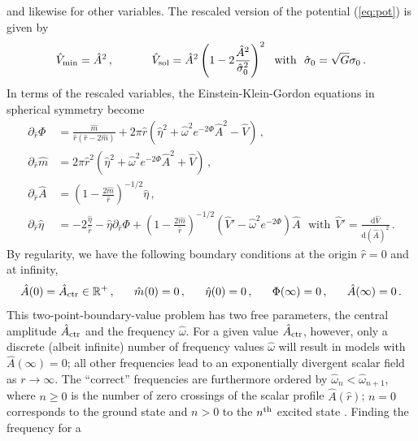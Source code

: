 \documentclass[]{iopart}
\newcommand{\du}{\mathrm{d}}
\begin{document}
%
and likewise for other variables. The rescaled version
of the potential (\ref{eq:pot}) is given by
%
\begin{equation}
  \hat{V}_{\rm min} = \hat{A}^2\,,~~~~~~~~~~
  \hat{V}_{\rm sol} =
  \hat{A}^2
  \left(
  1-2\frac{\hat{A}^2}{\hat{\sigma}_0^2}
  \right)^2~~\text{with}~~\hat{\sigma}_0=\sqrt{G}\sigma_0\,.
  \label{eq:potentials}
\end{equation}
%
In terms of the rescaled variables, the Einstein-Klein-Gordon
equations in spherical symmetry become
%
\begin{align}
  \partial_{\hat{r}}\Phi &=
  \frac{\hat{m}}{\hat{r}(\hat{r}-2\hat{m})}
  +
  2\pi \hat{r}
  \left(
  \hat{\eta}^2
  +\hat{\omega}^2e^{-2\Phi}\hat{A}^2
  -\hat{V}
  \right)\,, \label{eq:Phir} \\
  \partial_{\hat{r}}\hat{m} &=
  2\pi \hat{r}^2
  \left(
  \hat{\eta}^2
  +\hat{\omega}^2e^{-2\Phi}\hat{A}^2
  +\hat{V}
  \right)\,,
  \\
  \partial_{\hat{r}}\hat{A} &=
  \left(
  1-\frac{2\hat{m}}{\hat{r}}
  \right)^{-1/2}
  \hat{\eta}\,, \\
  \partial_{\hat{r}} \hat{\eta} &=
  -2\frac{\hat{\eta}}{\hat{r}}
  -\hat{\eta}\partial_{\hat{r}}\Phi
  +\left(
  1-\frac{2\hat{m}}{\hat{r}}
  \right)^{-1/2}
  (\hat{V}'-\hat{\omega}^2e^{-2\Phi})\hat{A}~~~
  \text{with}~~
  \hat{V}'=\frac{\du \hat{V}}{\du (\hat{A})^2}\,.
  \label{eq:etar}
\end{align}
%
By regularity, we have the following boundary conditions
at the origin $\hat{r}=0$ and at infinity,
%
\begin{equation}
  \hat{A}(0) = \hat{A}_{\rm ctr} \in \mathbb{R}^+\,,~~~~~
  \hat{m}(0) = 0\,,~~~~~
  \hat{\eta}(0) = 0\,,~~~~~
  \Phi(\infty) = 0\,,~~~~~
  \hat{A}(\infty) = 0\,.
\end{equation}
%
This two-point-boundary-value problem has two free
parameters, the central amplitude $\hat{A}_{\rm ctr}$ and the frequency
$\hat{\omega}$. For a given value $\hat{A}_{\rm ctr}$, however, only
a discrete (albeit infinite) number of frequency values
$\hat{\omega}$ will result in models with $\hat{A}(\infty)=0$;
all other frequencies lead to an exponentially divergent scalar
field as $r\rightarrow \infty$. The ``correct'' frequencies
are furthermore ordered by $\hat{\omega}_n<\hat{\omega}_{n+1}$,
where $n\ge 0$ is the number of zero crossings of the scalar
profile $\hat{A}(\hat{r})$; $n=0$ corresponds to the ground state
and $n>0$ to the $n^{\rm th}$ excited state
\cite{Balakrishna:1997ej}.
Finding the frequency for a
\end{document}
